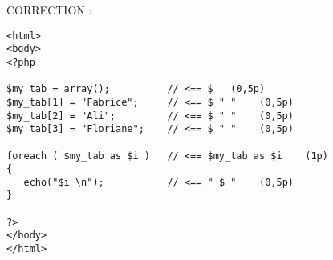 \documentclass[11pt,a4paper]{article}
\begin{document}
CORRECTION :

\medskip

\lstset{language=php}
\begin{lstlisting}[frame=single]
<html>
<body>
<?php

$my_tab = array();			// <== $   (0,5p)
$my_tab[1] = "Fabrice";		// <== $ " "    (0,5p)
$my_tab[2] = "Ali";			// <== $ " "    (0,5p)
$my_tab[3] = "Floriane";	// <== $ " "    (0,5p)

foreach ( $my_tab as $i )	// <== $my_tab as $i    (1p)
{
   echo("$i \n");			// <== " $ "    (0,5p)
}

?>
</body>
</html>
\end{lstlisting}

\bigskip
\end{document}
